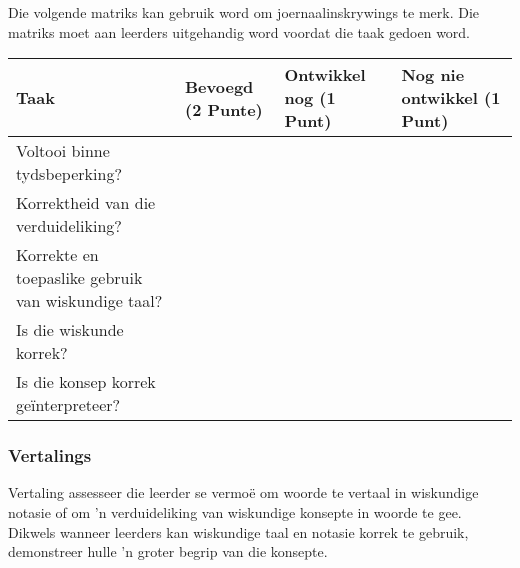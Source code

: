 Die volgende matriks kan gebruik word om joernaalinskrywings te
merk. Die matriks moet aan leerders uitgehandig word voordat die taak
gedoen word.
\begin{table}[H]
 \begin{center}
  \begin{tabular}{|p{4cm}|p{2cm}|p{2.5cm}|p{3cm}|} \hline
  \textbf{Taak} & \textbf{Bevoegd \newline(2 Punte)} & \textbf{Ontwikkel nog \newline(1 Punt)}& \textbf{Nog nie ontwikkel \newline (1 Punt)}\\ \hline
Voltooi binne tydsbeperking? &&&\\ \hline
Korrektheid van die verduideliking? &&&\\ \hline
Korrekte en toepaslike gebruik van wiskundige taal? &&&\\ \hline
Is die wiskunde korrek? &&&\\ \hline
Is die konsep korrek ge\"{i}nterpreteer?&&&\\ \hline

  \end{tabular}

 \end{center}

\end{table}

\subsubsection{Vertalings}
Vertaling assesseer die leerder se vermo\"{e} om woorde te vertaal in
wiskundige notasie of om 'n verduideliking van wiskundige konsepte in
woorde te gee. Dikwels wanneer leerders kan wiskundige taal en notasie
korrek te gebruik, demonstreer hulle 'n groter begrip van die
konsepte.

